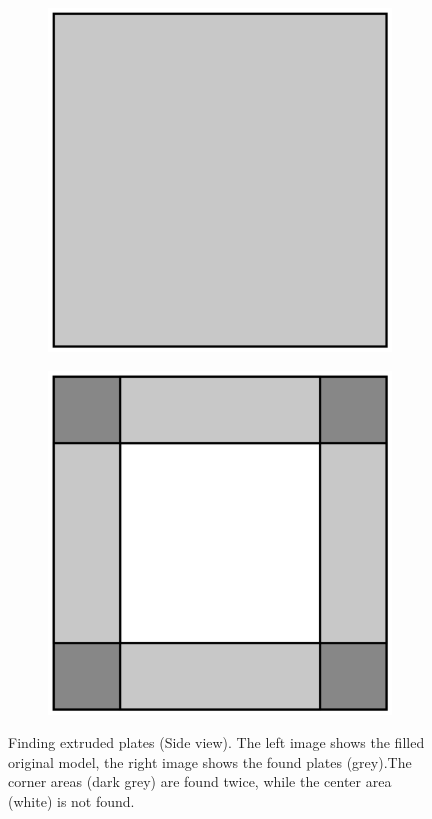 \documentclass[../ClassicThesis.tex]{subfiles}
\begin{document}
\begin{figure}
    \centering
    \begin{subfigure}[t]{0.4\textwidth}
      \centering
      \includegraphics[width=\textwidth]{Images/plates_extrudedplates_1.png}
    \end{subfigure}
    \begin{subfigure}[t]{0.4\textwidth}
      \centering
      \includegraphics[width=\textwidth]{Images/plates_extrudedplates_2.png}
    \end{subfigure}
    \caption{Finding extruded plates (Side view). The left image shows the filled original model, the right image shows the found plates (grey).The corner areas (dark grey) are found twice, while the center area (white) is not found.}
    \label{fig:extplates}
\end{figure}
\end{document}

